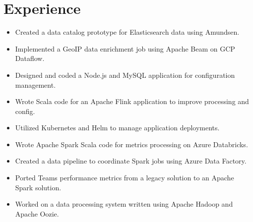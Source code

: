 \documentclass[letterpaper]{resume}
\begin{document}
\begin{minipage}[t]{0.72\textwidth} %


\section{Experience}

\begin{itemize}
\item Created a data catalog prototype for Elasticsearch data using Amundsen.
\item Implemented a GeoIP data enrichment job using Apache Beam on GCP Dataflow.
\item Designed and coded a Node.js and MySQL application for configuration management.
\item Wrote Scala code for an Apache Flink application to improve processing and config.
\item Utilized Kubernetes and Helm to manage application deployments.
\end{itemize}

\sectionspace %


\begin{itemize}
\item Wrote Apache Spark Scala code for metrics processing on Azure Databricks.
\item Created a data pipeline to coordinate Spark jobs using Azure Data Factory.
\item Ported Teams performance metrics from a legacy solution to an Apache Spark solution.
\item Worked on a data processing system written using Apache Hadoop and Apache Oozie. 
\end{itemize}

\sectionspace %



\end{minipage}
\end{document}
